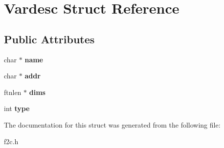 \hypertarget{structVardesc}{
\section{Vardesc Struct Reference}
\label{structVardesc}
}
\subsection*{Public Attributes}
\begin{DoxyCompactItemize}
\item 
\hypertarget{structVardesc_a9dcb9122e28bfb7d88caed2ffa38f1ad}{
char $\ast$ {\bfseries name}}
\label{structVardesc_a9dcb9122e28bfb7d88caed2ffa38f1ad}

\item 
\hypertarget{structVardesc_abc6f3753ac54741fafe32fcc744993ab}{
char $\ast$ {\bfseries addr}}
\label{structVardesc_abc6f3753ac54741fafe32fcc744993ab}

\item 
\hypertarget{structVardesc_a7be667d06905f6c6463ede740ed242ec}{
ftnlen $\ast$ {\bfseries dims}}
\label{structVardesc_a7be667d06905f6c6463ede740ed242ec}

\item 
\hypertarget{structVardesc_ac901f905f9cf2c9011684b7e612cc16c}{
int {\bfseries type}}
\label{structVardesc_ac901f905f9cf2c9011684b7e612cc16c}

\end{DoxyCompactItemize}


The documentation for this struct was generated from the following file:\begin{DoxyCompactItemize}
\item 
f2c.h\end{DoxyCompactItemize}
